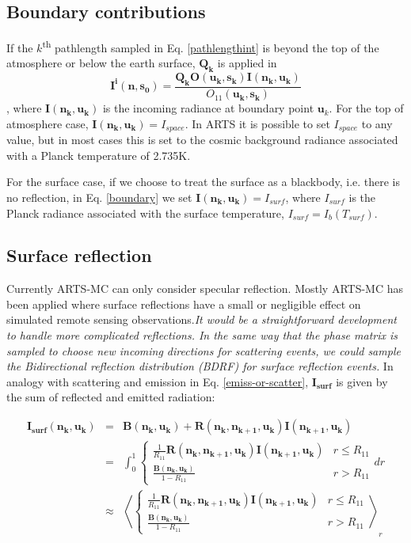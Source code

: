 \subsection {Boundary contributions}

If the $k$\textsuperscript{th} pathlength sampled in Eq. \ref{pathlengthint} is beyond the top of the atmosphere or below the earth surface, $\mathbf{Q_k}$ is applied in 
\begin{equation}
\mathbf{I^i(n,s_0)}=\frac{\mathbf{Q_k}\mathbf{O(u_k,s_k)I(n_k,u_k)}}{O_{11}(\mathbf{u_{k},s_k})}
\label{boundary}
\end{equation}
, where 
$\mathbf{I(n_k,u_k)}$ is the incoming radiance at boundary point $\mathbf{u}_{k}$.  For the top of atmosphere case, $\mathbf{I(n_k,u_k)}=I_{space}$.  In ARTS it is possible to set $I_{space}$ to any value, but in most cases this is set to the cosmic background radiance associated with a Planck temperature of 2.735K. 

For the surface case, if we choose to treat the surface as a blackbody, i.e. there is no reflection, in Eq. \ref{boundary} we set $\mathbf{I(n_k,u_k)}=I_{surf}$, where $I_{surf}$ is the Planck radiance associated with the surface temperature, $I_{surf}=I_b\left(T_{surf}\right)$. 

\subsection{Surface reflection} 
\label{sec:surf_refl}
Currently ARTS-MC can only consider specular reflection.  Mostly ARTS-MC has been applied where surface reflections have a small or negligible effect on simulated remote sensing observations.\emph{It would be a straightforward development to handle more complicated reflections.  In the same way that the phase matrix is sampled to choose new incoming directions for scattering events, we could sample the Bidirectional reflection distribution (BDRF) for surface reflection events.} In analogy with scattering and emission in Eq. \ref{emiss-or-scatter}, $\mathbf{I_{surf}}$ is given by the sum of reflected and emitted radiation:

\begin{eqnarray}
\mathbf{I_{surf}(n_k,u_k)}&=&\mathbf{B(n_k,u_k)}+\mathbf{R(n_k,n_{k+1},u_k)I(n_{k+1},u_k)}\nonumber\\
&=&\int^1_0\left\{\begin{array}{rl}\frac{1}{R_{11}}\mathbf{R(n_k,n_{k+1},u_k)I(n_{k+1},u_k)} & r \le R_{11}\\
\frac{\mathbf{B(n_k,u_k)}}{1-R_{11}}& r > R_{11}\end{array}dr\right.\nonumber\\
&\approx&
\left\langle\left\{\begin{array}{rl}\frac{1}{R_{11}}\mathbf{R(n_k,n_{k+1},u_k)I(n_{k+1},u_k)} & r \le R_{11}\\
\frac{\mathbf{B(n_k,u_k)}}{1-R_{11}}& r > R_{11}\end{array}\right.\right\rangle_r
\label{I_surf}
\end{eqnarray}

